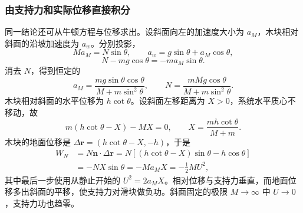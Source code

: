\documentclass[UTF8,fontset=fandol,a4paper,11pt]{ctexart}
\newcommand{\vect}[1]{\bm{#1}}
\begin{document}
\subsubsection*{由支持力和实际位移直接积分}
同一结论还可从牛顿方程与位移求出。设斜面向左的加速度大小为 $a_M$，木块相对斜面的沿坡加速度为 $a_w$。分别投影，
\[
Ma_M=N\sin\theta,\qquad
a_w=g\sin\theta+a_M\cos\theta,
\]
\[
N-mg\cos\theta=-ma_M\sin\theta.
\]
消去 $N$，得到恒定的
\[
a_M=\frac{mg\sin\theta\cos\theta}{M+m\sin^2\theta},\qquad
N=\frac{mMg\cos\theta}{M+m\sin^2\theta}.
\]
木块相对斜面的水平位移为 $h\cot\theta$。设斜面左移距离为 $X>0$，系统水平质心不移动，故
\[
m(h\cot\theta-X)-MX=0,\qquad
X=\frac{mh\cot\theta}{M+m}.
\]
木块的地面位移是 $\Delta\vect r=(h\cot\theta-X,-h)$，于是
\[
\begin{aligned}
W_N&=N\vect n\cdot\Delta\vect r
=N[(h\cot\theta-X)\sin\theta-h\cos\theta]\\
&=-NX\sin\theta=-Ma_MX=-\frac12MU^2,
\end{aligned}
\]
其中最后一步使用从静止开始的 $U^2=2a_MX$。相对位移与支持力垂直，而地面位移多出斜面的平移，使支持力对滑块做负功。斜面固定的极限 $M\to\infty$ 中 $U\to0$，支持力功也趋零。
\end{document}
